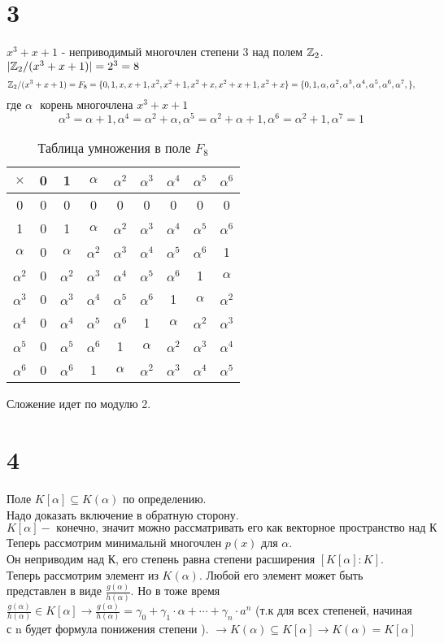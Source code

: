 		\section*{3}
		\newcommand{\al}{\alpha}
		$x^3+x+1$ - неприводимый многочлен степени 3 над полем $\mathbb{Z}_2$. $|\mathbb{Z}_2/(x^3+x+1)| = 2^3 = 8$\\
		$$\ZZ_2/(x^3+x+1) = F_8 = \{0,1 , x, x+1, x^2, x^2+1, x^2+x, x^2+x+1, x^2+x\} =\{0,1, \al ,\al^2, \al^3, \al^4, \al^5,\al^6,\al^7,\},$$ {где }$\al$ $\text{ корень многочлена } x^3+x+1$
		$$\al^3 = \al+1, \al^4 = \al^2+\al, \al^5 = \al^2+\al+1, \al^6 = \al^2+1, \al^7 = 1$$
\begin{table}[h]
	\centering
	\begin{tabular}{c|cccccccc}
		$\times$ & 0 & 1 & $\al$ & $\al^2$ & $\al^3$ & $\al^4$ & $\al^5$ & $\al^6$ \\
		\hline
		0 & 0 & 0 & 0 & 0 & 0 & 0 & 0 & 0 \\
		1 & 0 & 1 & $\al$ & $\al^2$ & $\al^3$ & $\al^4$ & $\al^5$ & $\al^6$ \\
		$\al$ & 0 & $\al$ & $\al^2$ & $\al^3$ & $\al^4$ & $\al^5$ & $\al^6$ & 1 \\
		$\al^2$ & 0 & $\al^2$ & $\al^3$ & $\al^4$ & $\al^5$ & $\al^6$ & 1 & $\al$ \\
		$\al^3$ & 0 & $\al^3$ & $\al^4$ & $\al^5$ & $\al^6$ & 1 & $\al$ & $\al^2$ \\
		$\al^4$ & 0 & $\al^4$ & $\al^5$ & $\al^6$ & 1 & $\al$ & $\al^2$ & $\al^3$ \\
		$\al^5$ & 0 & $\al^5$ & $\al^6$ & 1 & $\al$ & $\al^2$ & $\al^3$ & $\al^4$ \\
		$\al^6$ & 0 & $\al^6$ & 1 & $\al$ & $\al^2$ & $\al^3$ & $\al^4$ & $\al^5$ \\
	\end{tabular}
	\caption{Таблица умножения в поле $F_8$}
\end{table}
Сложение идет по модулю 2. 
\section*{4}
Поле $K[\al] \subseteq K(\al)$ по определению. \\
Надо доказать включение в обратную сторону. \\
$$K[\al] - \text{  конечно, значит можно рассматривать его как векторное пространство над К} $$
Теперь рассмотрим минимальнй многочлен $p(x)$ для $\al$.\\
Он неприводим над К, его степень равна степени расширения $[K[\al]:K]$.\\
Теперь рассмотрим элемент из $K(\al)$. Любой его элемент может быть представлен в виде $\frac{g(\al)}{h(\al )}$. Но в тоже время $\frac{g(\al)}{h(\al )}\in K[\al]\to\frac{g(\al)}{h(\al )} = \gamma_0 + \gamma_1\cdot\al + \cdots + \gamma_{n}\cdot a^n $
(т.к для всех степеней, начиная с n будет формула понижения степени ).
 $\to K(\al) \subseteq K[\al] \to    K(\al)= K[\al]  $
 
